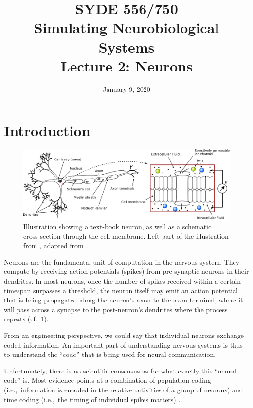 \documentclass[10pt,letterpaper,oneside]{article}
\date{January 9, 2020}
\title{SYDE 556/750 \\ Simulating Neurobiological Systems \\ Lecture 2: Neurons}
\begin{document}

\section{Introduction}


\begin{figure}[b]
	\centering
	\includegraphics{media/neuron_sketch_membrane.pdf}
	\caption{Illustration showing a text-book neuron, as well as a schematic cross-section through the cell membrane. Left part of the illustration from \cite{stoeckel2015design}, adapted from \cite{kandel2012principles}.}
	\label{fig:neuron_sketch_membrane}
\end{figure}

Neurons are the fundamental unit of computation in the nervous system. They compute by receiving action potentials (spikes) from pre-synaptic neurons in their dendrites. In most neurons, once the number of spikes received within a certain timespan surpasses a threshold, the neuron itself may emit an action potential that is being propagated along the neuron's axon to the axon terminal, where it will pass across a synapse to the post-neuron's dendrites where the process repeats (cf.~\cref{fig:neuron_sketch_membrane}).

From an engineering perspective, we could say that individual neurons exchange coded information. An important part of understanding nervous systems is thus to understand the \enquote{code} that is being used for neural communication.

Unfortunately, there is no scientific consensus as for what exactly this \enquote{neural code} is. Most evidence points at a combination of population coding (i.e.,~information is encoded in the relative activities of a group of neurons) and time coding (i.e.,~the timing of individual spikes matters) \cite{rieke1999spikes}.
\end{document}
